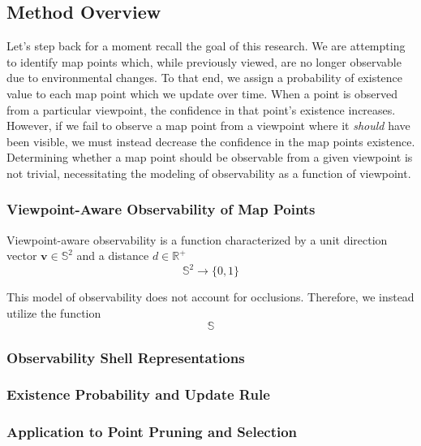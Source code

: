 \subsection{Method Overview}

Let's step back for a moment recall the goal of this research. We are attempting to identify map points which, while previously viewed, are no longer observable due to environmental changes. To that end, we assign a probability of existence value to each map point which we update over time. When a point is observed from a particular viewpoint, the confidence in that point's existence increases. However, if we fail to observe a map point from a viewpoint where it \textit{should} have been visible, we must instead decrease the confidence in the map points existence. Determining whether a map point should be observable from a given viewpoint is not trivial, necessitating the modeling of observability as a function of viewpoint.

\subsubsection{Viewpoint-Aware Observability of Map Points}


Viewpoint-aware observability is a function characterized by a unit direction vector $\mathbf{v}\in\mathbb{S}^2$ and a distance $d\in\mathbb{R}^+$
$$
    \mathbb{S}^2\rightarrow\{0,1\}
$$


This model of observability does not account for occlusions. Therefore, we instead utilize the function
$$
    \mathbb{S}
$$



\subsubsection{Observability Shell Representations}

\subsubsection{Existence Probability and Update Rule}

\subsubsection{Application to Point Pruning and Selection}
